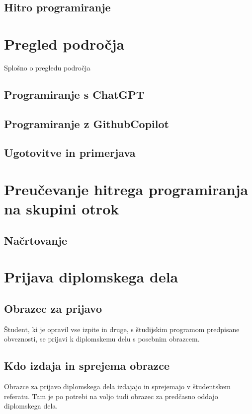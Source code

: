 \documentclass[12pt,a4paper]{book}
\begin{document}
\section{Hitro programiranje}

\chapter{Pregled področja}
Splošno o pregledu področja
\section{Programiranje s ChatGPT}

\section{Programiranje z GithubCopilot}


\section{Ugotovitve in primerjava}

\chapter{Preučevanje hitrega programiranja na skupini otrok}
\section{Načrtovanje}


\chapter{Prijava diplomskega dela}

\section{Obrazec za prijavo} 
Študent, ki je opravil vse izpite in druge, s študijskim programom predpisane obveznosti, se prijavi k diplomskemu delu s posebnim
obrazcem. 

\section{Kdo izdaja in sprejema obrazce} 
Obrazce za prijavo diplomskega dela izdajajo in sprejemajo v študentskem referatu. 
Tam je po potrebi na voljo tudi obrazec za predčasno oddajo diplom\-skega dela.
\end{document}
